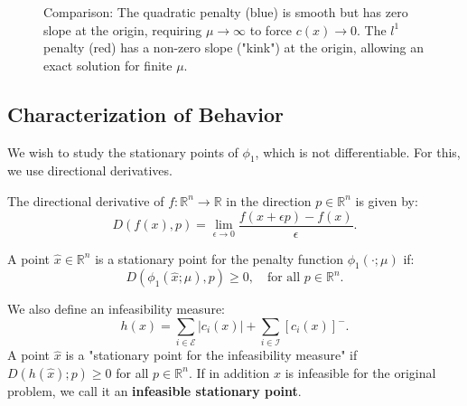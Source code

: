 \begin{figure}[H]
    \centering
    \caption{Comparison: The quadratic penalty (blue) is smooth but has zero slope at the origin, requiring $\mu \to \infty$ to force $c(x) \to 0$. The $l^1$ penalty (red) has a non-zero slope ("kink") at the origin, allowing an exact solution for finite $\mu$.}
\end{figure}

\subsection{Characterization of Behavior}

We wish to study the stationary points of $\phi_1$, which is not differentiable.
For this, we use directional derivatives.

\begin{definition}
    The directional derivative of $f: \mathbb{R}^n \to \mathbb{R}$ in the direction $p \in \mathbb{R}^n$ is given by:
    \[
        D(f(x), p) = \lim_{\epsilon \to 0} \frac{f(x + \epsilon p) - f(x)}{\epsilon}.
    \]
\end{definition}

\begin{definition}[Stationarity]
    A point $\hat{x} \in \mathbb{R}^n$ is a stationary point for the penalty function $\phi_1(\cdot; \mu)$ if:
    \[
        D(\phi_1(\hat{x}; \mu), p) \ge 0, \quad \text{for all } p \in \mathbb{R}^n.
    \]
\end{definition}

We also define an infeasibility measure:
\[
    h(x) = \sum_{i \in \mathcal{E}} |c_i(x)| + \sum_{i \in \mathcal{I}} [c_i(x)]^-.
\]
A point $\hat{x}$ is a "stationary point for the infeasibility measure" if $D(h(\hat{x}); p) \ge 0$ for all $p \in \mathbb{R}^n$.
If in addition $x$ is infeasible for the original problem, we call it an \textbf{infeasible stationary point}.

